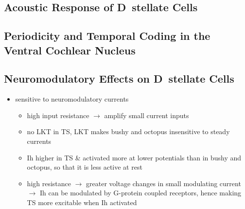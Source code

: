 \subsection{Acoustic Response of D~stellate  Cells}







\subsection{Periodicity and Temporal Coding in the Ventral Cochlear Nucleus}






\subsection{Neuromodulatory Effects on D~stellate Cells}




\begin{itemize}
\item sensitive to neuromodulatory currents \citep{FujinoOertel:2001}
\begin{itemize}
\item high input resistance $\rightarrow$ amplify small current inputs \citep{FujinoOertel:2001}
\item no LKT in TS,  LKT makes bushy and octopus insensitive to steady currents \citep{OertelFujino:2001,McGinleyOertel:2006}
\item Ih higher in TS \& activated more at lower potentials than in bushy and octopus, so that it is less active at rest
\item high resistance $\rightarrow$ greater voltage changes in small modulating current $\rightarrow$ Ih can be modulated by G-protein coupled receptors, hence making TS more excitable when Ih activated \citep{RodriguesOertel:2006}
\end{itemize}
\end{itemize}

